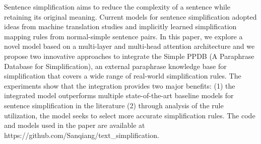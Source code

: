 Sentence simplification aims to reduce the complexity of a sentence while retaining its original meaning. Current models for sentence simplification adopted ideas from machine translation studies and implicitly learned simplification mapping rules from normal-simple sentence pairs. In this paper, we explore a novel model based on a multi-layer and multi-head attention architecture and we propose two innovative approaches to integrate the Simple PPDB (A Paraphrase Database for Simplification), an external paraphrase knowledge base for simplification that covers a wide range of real-world simplification rules. The experiments show that the integration provides two major benefits: (1) the integrated model outperforms multiple state-of-the-art baseline models for sentence simplification in the literature (2) through analysis of the rule utilization, the model seeks to select more accurate simplification rules. The code and models used in the paper are available at https://github.com/Sanqiang/text\_simplification.
